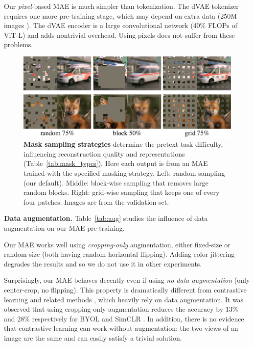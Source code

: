 \documentclass[10pt,twocolumn,letterpaper]{article}
\renewcommand{\paragraph}[1]{\vspace{1.25mm}\noindent\textbf{#1}}
\begin{document}
Our \textit{pixel}-based MAE is much simpler than tokenization. The dVAE tokenizer requires one more pre-training stage, which may depend on extra data (250M images \cite{Ramesh2021}). The dVAE encoder is a large convolutional network (40\% FLOPs of ViT-L) and adds nontrivial overhead. Using pixels does not suffer from these problems.

\begin{figure}[t]
\centering
\includegraphics[width=0.99\linewidth]{fig/mask_sampling}
\vspace{-.3em}
\caption{\textbf{Mask sampling strategies} determine the pretext task difficulty, influencing reconstruction quality and representations (Table~\ref{tab:mask_types}). Here each output is from an MAE trained with the specified masking strategy. {Left}: random sampling (our default). {Middle}: block-wise sampling \cite{Bao2021} that removes large random blocks. {Right}: grid-wise sampling that keeps one of every four patches. Images are from the validation set.}
\label{fig:mask_sampling}\vspace{.5em}
\end{figure}

\paragraph{Data augmentation.} Table~\ref{tab:aug} studies the influence of data augmentation on our MAE pre-training.

Our MAE works well using \textit{cropping-only} augmentation, either fixed-size or random-size (both having random horizontal flipping). Adding color jittering degrades the results and so we do not use it in other experiments.

Surprisingly, our MAE behaves decently even if using \textit{no data augmentation} (only center-crop, no flipping). This property is dramatically different from contrastive learning and related methods \cite{Wu2018a,He2020,Chen2020,Grill2020}, which heavily rely on data augmentation. It was observed \cite{Grill2020} that using cropping-only augmentation reduces the accuracy by 13\% and 28\% respectively for BYOL \cite{Grill2020} and SimCLR \cite{Chen2020}. In addition, there is no evidence that contrastive learning can work without augmentation: the two views of an image are the same and can easily satisfy a trivial solution.
\end{document}
